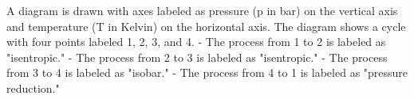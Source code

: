 A diagram is drawn with axes labeled as pressure (p in bar) on the vertical axis and temperature (T in Kelvin) on the horizontal axis. The diagram shows a cycle with four points labeled 1, 2, 3, and 4.  
- The process from 1 to 2 is labeled as "isentropic."  
- The process from 2 to 3 is labeled as "isentropic."  
- The process from 3 to 4 is labeled as "isobar."  
- The process from 4 to 1 is labeled as "pressure reduction."